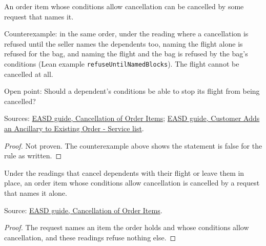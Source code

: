 \begin{theorem}
  \label{thm:ancillaries-cancel-allowed}
  An order item whose conditions allow cancellation can be cancelled by
  some request that names it.

  Counterexample: in the same order, under the reading where a cancellation
  is refused until the seller names the dependents too, naming the flight
  alone is refused for the bag, and naming the flight and the bag is refused
  by the bag's conditions (Lean example \texttt{refuseUntilNamedBlocks}).
  The flight cannot be cancelled at all.

  Open point: Should a dependent's conditions be able to stop its flight
  from being cancelled?

  Sources: \href{https://standards.atlassian.net/wiki/spaces/EASD/pages/574783569}{EASD guide, Cancellation of Order Items};
  \href{https://standards.atlassian.net/wiki/spaces/EASD/pages/842301531}{EASD guide, Customer Adds an Ancillary to Existing Order - Service list}.
\end{theorem}
\begin{proof}
  Not proven.  The counterexample above shows the statement is false for the
  rule as written.
\end{proof}

\begin{theorem}
  \label{thm:ancillaries-cancel-allowed-of-not-refuse}
  Under the readings that cancel dependents with their flight or leave them
  in place, an order item whose conditions allow cancellation is cancelled
  by a request that names it alone.

  Source: \href{https://standards.atlassian.net/wiki/spaces/EASD/pages/574783569}{EASD guide, Cancellation of Order Items}.
\end{theorem}
\begin{proof}
  The request names an item the order holds and whose conditions allow
  cancellation, and these readings refuse nothing else.
\end{proof}

